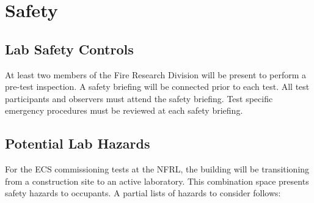 \documentclass[12pt,oneside]{book}
\begin{document}
\chapter{Safety}
\label{safety}
\section{Lab Safety Controls}
\label{controls}
At least two members of the Fire Research Division will be present to perform a pre-test inspection. A safety briefing will be connected prior to each test. All test participants and observers must attend the safety briefing. Test specific emergency procedures must be reviewed at each safety briefing.

\section{Potential Lab Hazards}
\label{lab_hazards}
For the ECS commissioning tests at the NFRL, the building will be transitioning from a construction site to an active laboratory. This combination space presents safety hazards to occupants. A partial lists of hazards to consider follows:
\end{document}
